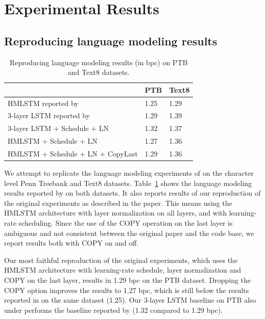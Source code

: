 \section{Experimental Results}
\label{sec:results}
\subsection{Reproducing language modeling results}

\begin{table}[t]
\centering
\begin{tabular}{lll}
                        & {\bf PTB } & {\bf Text8} \\
\hline
HMLSTM reported by \citep{chung2016hierarchical}  & 1.25 & 1.29	\\
3-layer LSTM reported by \citep{chung2016hierarchical}  & 1.29 & 1.39	\\
\hline
3-layer LSTM + Schedule + LN & 1.32  &  1.37\\

HMLSTM + Schedule + LN    & 1.27 & 1.36 \\
HMLSTM + Schedule + LN + CopyLast & 1.29  &  1.36\\
\hline 
\end{tabular}
\caption{Reproducing language modeling results (in bpc) on PTB and Text8 datasets. 
}
\label{tab:LM-reproduction}
\end{table}


We attempt to replicate the language modeling experiments of 
\cite{chung2016hierarchical} on the character level Penn Treebank 
and Text8  datasets. Table~\ref{tab:LM-reproduction} shows the 
language modeling results reported by \cite{chung2016hierarchical} 
on both datasets. It also reports results of our reproduction 
of the original experiments as described 
in the paper. This means using the HMLSTM architecture with 
layer normalization on all layers, and with learning-rate 
scheduling. Since the use of the COPY operation on the last layer is 
ambiguous and not consistent between the original paper and the 
code base, we report results both with COPY on and off.

Our most faithful reproduction of the original experiments, 
which uses the HMLSTM architecture with learning-rate schedule, 
layer normalization and COPY on the last layer, results in 1.29 bpc 
on the PTB dataset. Dropping the COPY
option improves the results to 1.27 bpc, which is still below 
the results reported in \cite{chung2016hierarchical} on the 
same dataset (1.25). Our 3-layer LSTM baseline on PTB also under performs the baseline reported by \cite{chung2016hierarchical}(1.32 compared to 1.29 bpc).

